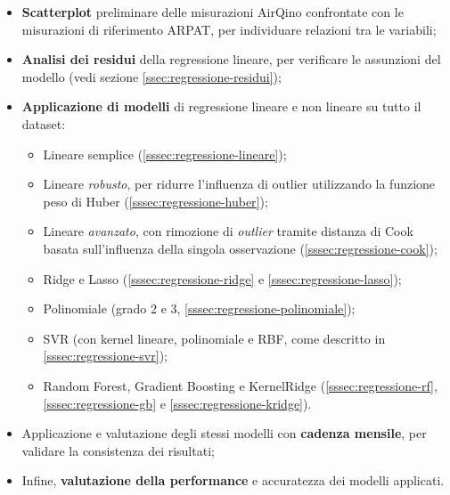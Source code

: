 \begin{itemize}
  \item \textbf{Scatterplot} preliminare delle misurazioni AirQino confrontate con le misurazioni di riferimento ARPAT, per individuare relazioni tra le variabili;
  \item \textbf{Analisi dei residui} della regressione lineare, per verificare le assunzioni del modello (vedi sezione \ref{ssec:regressione-residui});
  \item \textbf{Applicazione di modelli} di regressione lineare e non lineare su tutto il dataset:
        \begin{itemize}
          \item Lineare semplice (\ref{sssec:regressione-lineare});
          \item Lineare \textit{robusto}, per ridurre l'influenza di outlier utilizzando la funzione peso di Huber (\ref{sssec:regressione-huber});
          \item Lineare \textit{avanzato}, con rimozione di \textit{outlier} tramite distanza di Cook basata sull'influenza della singola osservazione (\ref{sssec:regressione-cook});
          \item Ridge e Lasso (\ref{sssec:regressione-ridge} e \ref{sssec:regressione-lasso});
          \item Polinomiale (grado 2 e 3, \ref{sssec:regressione-polinomiale});
          \item SVR (con kernel lineare, polinomiale e RBF, come descritto in \ref{sssec:regressione-svr});
          \item Random Forest, Gradient Boosting e KernelRidge (\ref{sssec:regressione-rf}, \ref{sssec:regressione-gb} e \ref{sssec:regressione-kridge}).
        \end{itemize}
    \item Applicazione e valutazione degli stessi modelli con \textbf{cadenza mensile}, per validare la consistenza dei risultati;
    \item Infine, \textbf{valutazione della performance} e accuratezza dei modelli applicati.
\end{itemize}

